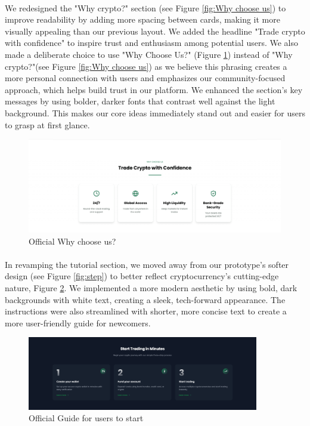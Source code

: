 \paragraph{}We redesigned the "Why crypto?" section (see Figure \ref{fig:Why choose us}) to improve readability by adding more spacing between cards, making it more visually appealing than our previous layout. We added the headline "Trade crypto with confidence" to inspire trust and enthusiasm among potential users. We also made a deliberate choice to use "Why Choose Us?" (Figure \ref{fig:Why_choose_us_2.0}) instead of "Why crypto?"(see Figure \ref{fig:Why choose us}) as we believe this phrasing creates a more personal connection with users and emphasizes our community-focused approach, which helps build trust in our platform. We enhanced the section's key messages by using bolder, darker fonts that contrast well against the light background. This makes our core ideas immediately stand out and easier for users to grasp at first glance.
  \begin{figure}[h]
    \centering
    \includegraphics[width= 1\textwidth]{figures/deploy_change_2.png}
     \caption{Official Why choose us?}
    \label{fig:Why_choose_us_2.0}
\end{figure}
\paragraph{} In revamping the tutorial section, we moved away from our prototype's softer design (see Figure \ref{fig:step}) to better reflect cryptocurrency's cutting-edge nature, Figure \ref{fig:step_2.0}. We implemented a more modern aesthetic by using bold, dark backgrounds with white text, creating a sleek, tech-forward appearance. The instructions were also streamlined with shorter, more concise text to create a more user-friendly guide for newcomers.
  \begin{figure}[h]
    \centering
    \includegraphics[width= 0.9\textwidth, keepaspectratio]{figures/Screenshot 2025-02-16 154618.png}
     \caption{Official Guide for users to start}
    \label{fig:step_2.0}
\end{figure}
